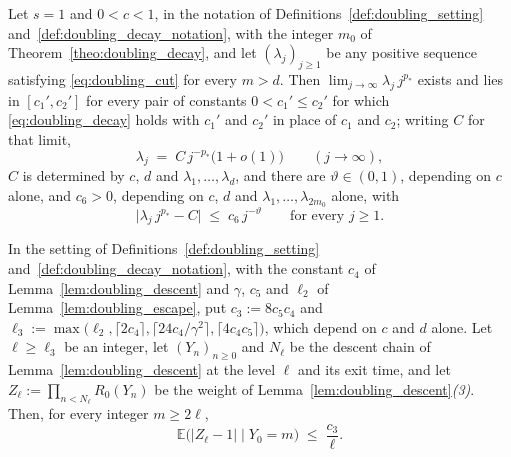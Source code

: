 \begin{theorem}\label{theo:doubling_sharp}
Let $s=1$ and $0<c<1$, in the notation of Definitions~\ref{def:doubling_setting}
and~\ref{def:doubling_decay_notation}, with the integer $m_0$ of
Theorem~\ref{theo:doubling_decay}, and let $(\lambda_j)_{j\geq1}$ be any positive sequence
satisfying \eqref{eq:doubling_cut} for every $m>d$. Then
$\lim_{j\rightarrow\infty}\lambda_j\,j^{p_*}$ exists and lies in $[c_1',c_2']$ for every pair
of constants $0<c_1'\leq c_2'$ for which \eqref{eq:doubling_decay} holds with $c_1'$ and $c_2'$
in place of $c_1$ and $c_2$; writing $C$ for that limit,
\begin{equation}\label{eq:doubling_sharp}
    \lambda_j\;=\;C\,j^{-p_*}\bigl(1+o(1)\bigr)\qquad(j\rightarrow\infty),
\end{equation}
$C$ is determined by $c$, $d$ and $\lambda_1,\dots,\lambda_d$, and there are
$\vartheta\in(0,1)$, depending on $c$ alone, and $c_6>0$, depending on $c$, $d$ and
$\lambda_1,\dots,\lambda_{2m_0}$ alone, with
\begin{equation}\label{eq:doubling_rate}
    \bigl|\lambda_j\,j^{p_*}-C\bigr|\;\leq\;c_6\,j^{-\vartheta}
    \qquad\text{for every }j\geq1 .
\end{equation}
\end{theorem}

\begin{lemma}\label{lem:doubling_weight}
In the setting of Definitions~\ref{def:doubling_setting} and~\ref{def:doubling_decay_notation},
with the constant $c_4$ of Lemma~\ref{lem:doubling_descent} and $\gamma$, $c_5$ and $\ell_2$
of Lemma~\ref{lem:doubling_escape}, put $c_3:=8c_5c_4$ and
$\ell_3:=\max\bigl(\ell_2,\lceil2c_4\rceil,\lceil24c_4/\gamma^2\rceil,\lceil4c_4c_5\rceil\bigr)$,
which depend on $c$ and $d$ alone. Let $\ell\geq\ell_3$ be an integer, let $(Y_n)_{n\geq0}$ and
$N_\ell$ be the descent chain of Lemma~\ref{lem:doubling_descent} at the level $\ell$ and its
exit time, and let $Z_\ell:=\prod_{n<N_\ell}R_0(Y_n)$ be the weight of
Lemma~\ref{lem:doubling_descent}\emph{(3)}. Then, for every integer $m\geq2\ell$,
\begin{equation}\label{eq:doubling_weight}
    \mathbb E\bigl(|Z_\ell-1|\mid Y_0=m\bigr)\;\leq\;\frac{c_3}{\ell} .
\end{equation}
\end{lemma}

